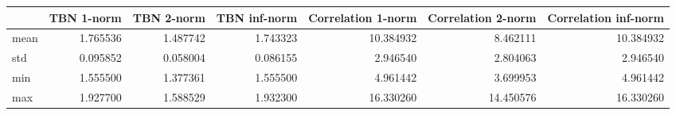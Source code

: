 \begin{tabular}{lrrrrrr}
\toprule
{} &  TBN 1-norm &  TBN 2-norm &  TBN inf-norm &  Correlation 1-norm &  Correlation 2-norm &  Correlation inf-norm \\
\midrule
mean &    1.765536 &    1.487742 &      1.743323 &           10.384932 &            8.462111 &             10.384932 \\
std  &    0.095852 &    0.058004 &      0.086155 &            2.946540 &            2.804063 &              2.946540 \\
min  &    1.555500 &    1.377361 &      1.555500 &            4.961442 &            3.699953 &              4.961442 \\
max  &    1.927700 &    1.588529 &      1.932300 &           16.330260 &           14.450576 &             16.330260 \\
\bottomrule
\end{tabular}
